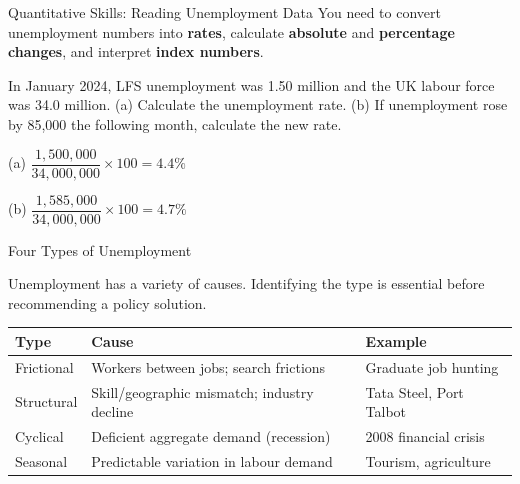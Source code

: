\documentclass[16pt,aspectratio=169]{beamer}
\begin{document}
\begin{frame}{Quantitative Skills: Reading Unemployment Data}
    You need to convert unemployment numbers into \textbf{rates}, calculate \textbf{absolute} and \textbf{percentage changes}, and interpret \textbf{index numbers}.

    \vspace{0.4em}
    \begin{examplequestion}
        In January 2024, LFS unemployment was 1.50 million and the UK labour force was 34.0 million.
        (a) Calculate the unemployment rate. (b) If unemployment rose by 85,000 the following month, calculate the new rate.
    \end{examplequestion}

    \vspace{0.3em}
    \begin{examplesolution}
        (a) $\dfrac{1{,}500{,}000}{34{,}000{,}000} \times 100 = \mathbf{4.4\%}$

        \vspace{0.3em}
        (b) $\dfrac{1{,}585{,}000}{34{,}000{,}000} \times 100 = \mathbf{4.7\%}$
    \end{examplesolution}
\end{frame}

\begin{frame}{Four Types of Unemployment}
    \begin{keypoint}
        Unemployment has a variety of causes. Identifying the type is essential before recommending a policy solution.
    \end{keypoint}

    \vspace{0.4em}
    \begin{table}
        \centering
        \renewcommand{\arraystretch}{1.15}
        \begin{tabular}{@{}p{2.8cm}p{6.0cm}p{4.0cm}@{}}
            \toprule
            \textbf{Type} & \textbf{Cause} & \textbf{Example} \\ \midrule
            Frictional  & Workers between jobs; search frictions & Graduate job hunting \\
            Structural  & Skill/geographic mismatch; industry decline & Tata Steel, Port Talbot \\
            Cyclical    & Deficient aggregate demand (recession) & 2008 financial crisis \\
            Seasonal    & Predictable variation in labour demand & Tourism, agriculture \\ \bottomrule
        \end{tabular}
    \end{table}
\end{frame}
\end{document}
